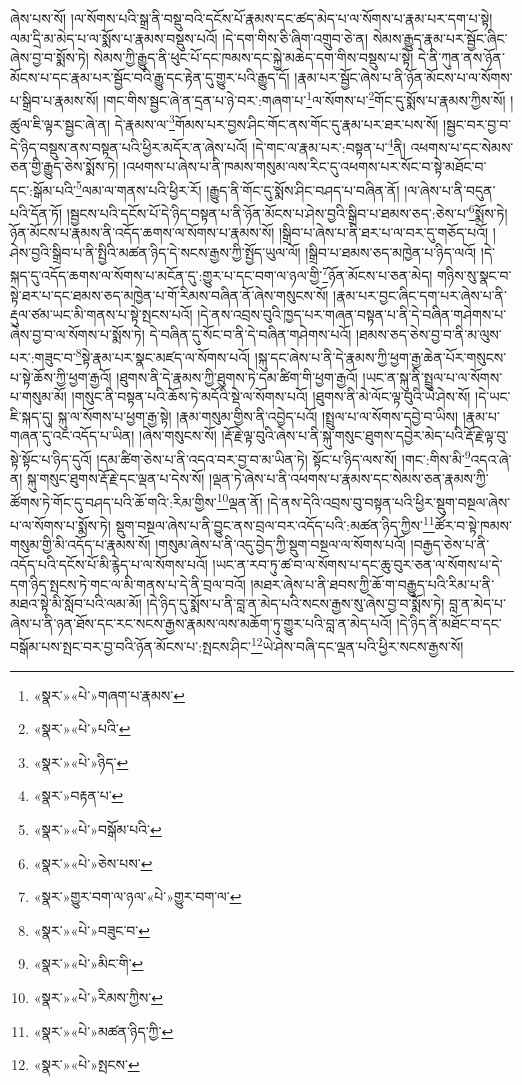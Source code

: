 ཞེས་པས་སོ། །ལ་སོགས་པའི་སྒྲ་ནི་བསྡུ་བའི་དངོས་པོ་རྣམས་དང་ཚད་མེད་པ་ལ་སོགས་པ་རྣམ་པར་དག་པ་སྟེ། ལམ་དྲི་མ་མེད་པ་ལ་སྨོས་པ་རྣམས་བསྡུས་པའོ། །དེ་དག་གིས་ཅི་ཞིག་འགྲུབ་ཅེ་ན། སེམས་རྒྱུད་རྣམ་པར་སྦྱོང་ཞིང་ཞེས་བྱ་བ་སྨོས་ཏེ། སེམས་ཀྱི་རྒྱུད་ནི་ཕུང་པོ་དང་ཁམས་དང་སྐྱེ་མཆེད་དག་གིས་བསྡུས་པ་སྟེ། དེ་ནི་ཀུན་ནས་ཉོན་མོངས་པ་དང་རྣམ་པར་སྦྱོང་བའི་རྒྱུ་དང་རྟེན་དུ་གྱུར་པའི་རྒྱུད་དོ། །རྣམ་པར་སྦྱོང་ཞེས་པ་ནི་ཉོན་མོངས་པ་ལ་སོགས་པ་སྒྲིབ་པ་རྣམས་སོ། །གང་གིས་སྦྱང་ཞེ་ན་དྲན་པ་ཉེ་བར་:གཞག་པ་\footnote{«སྣར་»«པེ་»གཞག་པ་རྣམས་}ལ་སོགས་པ་\footnote{«སྣར་»«པེ་»པའི་}གོང་དུ་སྨོས་པ་རྣམས་ཀྱིས་སོ། །ཚུལ་ཇི་ལྟར་སྦྱང་ཞེ་ན། དེ་རྣམས་ལ་\footnote{«སྣར་»«པེ་»ཉིད་}གོམས་པར་བྱས་ཤིང་གོང་ནས་གོང་དུ་རྣམ་པར་ཐར་པས་སོ། །སྦྱང་བར་བྱ་བ་དེ་ཉིད་བསྡུས་ནས་བསྟན་པའི་ཕྱིར་མདོར་ན་ཞེས་པའོ། །དེ་གང་ལ་རྣམ་པར་:བསྟན་པ་\footnote{«སྣར་»བརྟན་པ་}ནི། འཕགས་པ་དང་སེམས་ཅན་གྱི་རྒྱུད་ཅེས་སྨོས་ཏེ། །འཕགས་པ་ཞེས་པ་ནི་ཁམས་གསུམ་ལས་རིང་དུ་འཕགས་པར་སོང་བ་སྟེ་མཐོང་བ་དང་:སྒོམ་པའི་\footnote{«སྣར་»«པེ་»བསྒོམ་པའི་}ལམ་ལ་གནས་པའི་ཕྱིར་རོ། །རྒྱུད་ནི་གོང་དུ་སྨོས་ཤིང་བཤད་པ་བཞིན་ནོ། །ལ་ཞེས་པ་ནི་བདུན་པའི་དོན་ཏོ། །སྦྱངས་པའི་དངོས་པོ་དེ་ཉིད་བསྟན་པ་ནི་ཉོན་མོངས་པ་ཤེས་བྱའི་སྒྲིབ་པ་ཐམས་ཅད་:ཅེས་པ་\footnote{«སྣར་»«པེ་»ཅེས་པས་}སྨོས་ཏེ། ཉོན་མོངས་པ་རྣམས་ནི་འདོད་ཆགས་ལ་སོགས་པ་རྣམས་སོ། །སྒྲིབ་པ་ཞེས་པ་ནི་ཐར་པ་ལ་བར་དུ་གཅོད་པའོ། །ཤེས་བྱའི་སྒྲིབ་པ་ནི་སྤྱིའི་མཚན་ཉིད་དེ་སངས་རྒྱས་ཀྱི་སྤྱོད་ཡུལ་ལོ། །སྒྲིབ་པ་ཐམས་ཅད་མཁྱེན་པ་ཉིད་ལའོ། །དེ་སྐད་དུ་འདོད་ཆགས་ལ་སོགས་པ་མངོན་དུ་:གྱུར་པ་དང་བག་ལ་ཉལ་གྱི་\footnote{«སྣར་»གྱུར་བག་ལ་ཉལ་«པེ་»གྱུར་བག་ལ་}ཉོན་མོངས་པ་ཅན་མེད། གཉིས་སུ་སྣང་བ་སྟེ་ཐར་པ་དང་ཐམས་ཅད་མཁྱེན་པ་གོ་རིམས་བཞིན་ནོ་ཞེས་གསུངས་སོ། །རྣམ་པར་བྱང་ཞིང་དག་པར་ཞེས་པ་ནི་རྡུལ་ཙམ་ཡང་མི་གནས་པ་སྟེ་སྤངས་པའོ། །དེ་ནས་འབྲས་བུའི་ཁྱད་པར་གཞན་བསྟན་པ་ནི་དེ་བཞིན་གཤེགས་པ་ཞེས་བྱ་བ་ལ་སོགས་པ་སྨོས་ཏེ། དེ་བཞིན་དུ་སོང་བ་ནི་དེ་བཞིན་གཤེགས་པའོ། །ཐམས་ཅད་ཅེས་བྱ་བ་ནི་མ་ལུས་པར་:གཟུང་བ་\footnote{«སྣར་»«པེ་»བཟུང་བ་}སྟེ་རྣམ་པར་སྣང་མཛད་ལ་སོགས་པའོ། །སྐུ་དང་ཞེས་པ་ནི་དེ་རྣམས་ཀྱི་ཕྱག་རྒྱ་ཆེན་པོར་གསུངས་པ་སྟེ་ཆོས་ཀྱི་ཕྱག་རྒྱའོ། །ཐུགས་ནི་དེ་རྣམས་ཀྱི་ཐུགས་ཏེ་དམ་ཚིག་གི་ཕྱག་རྒྱའོ། །ཡང་ན་སྐུ་ནི་སྤྲུལ་པ་ལ་སོགས་པ་གསུམ་མོ། །གསུང་ནི་བསྟན་པའི་ཆོས་ཏེ་མདོའི་སྡེ་ལ་སོགས་པའོ། །ཐུགས་ནི་མེ་ལོང་ལྟ་བུའི་ཡེ་ཤེས་སོ། །དེ་ཡང་ཇི་སྐད་དུ། སྐུ་ལ་སོགས་པ་ཕྱག་རྒྱ་སྟེ། །རྣམ་གསུམ་གྱིས་ནི་འབྱེད་པའོ། །སྤྲུལ་པ་ལ་སོགས་དབྱེ་བ་ཡིས། །རྣམ་པ་གཞན་དུ་འང་འདོད་པ་ཡིན། །ཞེས་གསུངས་སོ། །རྡོ་རྗེ་ལྟ་བུའི་ཞེས་པ་ནི་སྐུ་གསུང་ཐུགས་དབྱེར་མེད་པའི་རྡོ་རྗེ་ལྟ་བུ་སྟེ་སྟོང་པ་ཉིད་དུའོ། །དམ་ཚིག་ཅེས་པ་ནི་འདའ་བར་བྱ་བ་མ་ཡིན་ཏེ། སྟོང་པ་ཉིད་ལས་སོ། །གང་:གིས་མི་\footnote{«སྣར་»«པེ་»མིང་གི་}འདའ་ཞེ་ན། སྐུ་གསུང་ཐུགས་རྡོ་རྗེ་དང་ལྡན་པ་དེས་སོ། །ལྡན་ཏེ་ཞེས་པ་ནི་འཕགས་པ་རྣམས་དང་སེམས་ཅན་རྣམས་ཀྱི་ཚོགས་ཏེ་གོང་དུ་བཤད་པའི་ཆོ་གའི་:རིམ་གྱིས་\footnote{«སྣར་»«པེ་»རིམས་ཀྱིས་}ལྡན་ནོ། །དེ་ནས་དེའི་འབྲས་བུ་བསྟན་པའི་ཕྱིར་སྡུག་བསྔལ་ཞེས་པ་ལ་སོགས་པ་སྨོས་ཏེ། སྡུག་བསྔལ་ཞེས་པ་ནི་བྱུང་ནས་བྲལ་བར་འདོད་པའི་:མཚན་ཉིད་ཀྱིས་\footnote{«སྣར་»«པེ་»མཚན་ཉིད་ཀྱི་}ཚོར་བ་སྟེ་ཁམས་གསུམ་གྱི་མི་འདོད་པ་རྣམས་སོ། །གསུམ་ཞེས་པ་ནི་འདུ་བྱེད་ཀྱི་སྡུག་བསྔལ་ལ་སོགས་པའོ། །བརྒྱད་ཅེས་པ་ནི་འདོད་པའི་དངོས་པོ་མི་རྙེད་པ་ལ་སོགས་པའོ། །ཡང་ན་རབ་ཏུ་ཚ་བ་ལ་སོགས་པ་དང་ཆུ་བུར་ཅན་ལ་སོགས་པ་དེ་དག་ཉིད་སྤངས་ཏེ་གང་ལ་མི་གནས་པ་དེ་ནི་བྲལ་བའོ། །མཐར་ཞེས་པ་ནི་ཐབས་ཀྱི་ཆོ་ག་བརྒྱུད་པའི་རིམ་པ་ནི་མཐའ་སྟེ་མི་སློབ་པའི་ལམ་མོ། །དེ་ཉིད་དུ་སྨོས་པ་ནི་བླ་ན་མེད་པའི་སངས་རྒྱས་སུ་ཞེས་བྱ་བ་སྨོས་ཏེ། བླ་ན་མེད་པ་ཞེས་པ་ནི་ཉན་ཐོས་དང་རང་སངས་རྒྱས་རྣམས་ལས་མཆོག་ཏུ་གྱུར་པའི་བླ་ན་མེད་པའོ། །དེ་ཉིད་ནི་མཐོང་བ་དང་བསྒོམ་པས་སྤང་བར་བྱ་བའི་ཉོན་མོངས་པ་:སྤངས་ཤིང་\footnote{«སྣར་»«པེ་»སྤངས་}ཡེ་ཤེས་བཞི་དང་ལྡན་པའི་ཕྱིར་སངས་རྒྱས་སོ། 